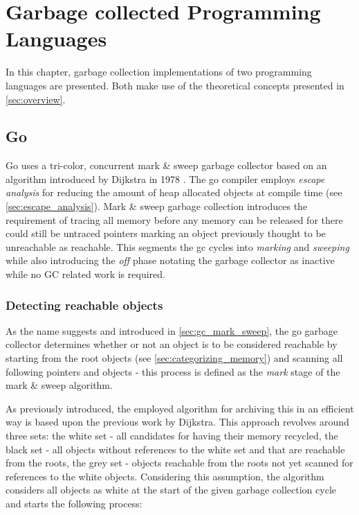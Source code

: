 \chapter{Garbage collected Programming Languages}

In this chapter, garbage collection implementations of two programming
languages are presented. Both make use of the theoretical concepts presented
in \autoref{sec:overview}.

\section{Go}

Go uses a tri-color, concurrent mark \& sweep garbage collector based on an
algorithm introduced by Dijkstra in 1978 \cite{dijkstra-gc-1978}. The go
compiler employs \textit{escape analysis} for reducing the amount of heap
allocated objects at compile time (see \autoref{sec:escape_analysis}). Mark \&
sweep garbage collection introduces the requirement of tracing all memory
before any memory can be released \cite[The GC cycle]{go_gcguide_2022} for
there could still be untraced pointers marking an object previously thought to
be unreachable as reachable. This segments the gc cycles into \textit{marking}
and \textit{sweeping} while also introducing the \textit{off} phase notating
the garbage collector as inactive while no GC related work is required.

\subsection{Detecting reachable objects}

As the name suggests and introduced in \autoref{sec:gc_mark_sweep}, the go
garbage collector determines whether or not an object is to be considered
reachable by starting from the root objects (see
\autoref{sec:categorizing_memory}) and scanning all following pointers and
objects - this process is defined as the \textit{mark} stage of the mark \&
sweep algorithm.

As previously introduced, the employed algorithm for archiving this in an
efficient way is based upon the previous work by Dijkstra. This approach
revolves around three sets: the white set - all candidates for having their
memory recycled, the black set - all objects without references to the white
set and that are reachable from the roots, the grey set - objects reachable
from the roots not yet scanned for references to the white objects. Considering
this assumption, the algorithm considers all objects as white at the start of
the given garbage collection cycle and starts the following process:


